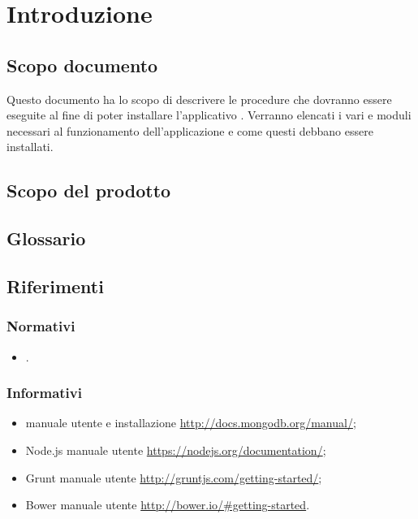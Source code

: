 \section{Introduzione} \label{intro}
\subsection{Scopo documento}
Questo documento ha lo scopo di descrivere le procedure che dovranno essere eseguite al fine di poter installare l'applicativo \Premi.
Verranno elencati i vari  e moduli necessari al funzionamento dell'applicazione e come questi debbano essere installati.
\subsection{Scopo del prodotto}
\scopoProdotto
\subsection{Glossario} %
\descrizioneGlossario
\subsection{Riferimenti}
\subsubsection{Normativi}
\begin{itemize}
\item \normeDiProgetto.
\end{itemize}
\subsubsection{Informativi}
\begin{itemize}
\item {} manuale utente e installazione \url{http://docs.mongodb.org/manual/};
\item Node.js manuale utente \url{https://nodejs.org/documentation/};
\item Grunt manuale utente \url{http://gruntjs.com/getting-started/};
\item Bower manuale utente \url{http://bower.io/#getting-started}.
\end{itemize}
